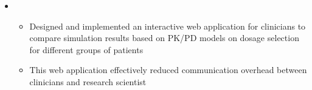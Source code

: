 \documentclass[11pt,a4paper,sans]{moderncv}        %
\begin{document}
\begin{itemize}
	\vspace{4pt}

	\item{
		{\vspace{3pt}
			\begin{itemize} pt
				\item %
				Designed and implemented an interactive web application for clinicians to compare simulation results based on PK/PD models on dosage selection for different groups of patients
				\item This web application effectively reduced communication overhead between clinicians and research scientist  
			\end{itemize}}}

	\vspace{4pt}


\end{itemize}
\end{document}
